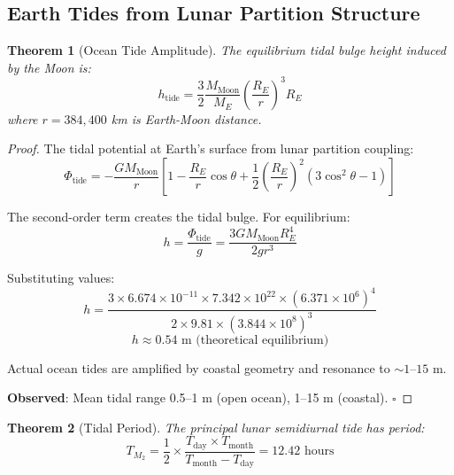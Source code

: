 \documentclass[twocolumn,10pt]{article}
\newtheorem{theorem}{Theorem}[section]
\theoremstyle{definition}
\theoremstyle{remark}
\begin{document}
\subsection{Earth Tides from Lunar Partition Structure}

\begin{theorem}[Ocean Tide Amplitude]
\label{thm:tides}
The equilibrium tidal bulge height induced by the Moon is:
\begin{equation}
h_{\text{tide}} = \frac{3}{2} \frac{M_{\text{Moon}}}{M_E} \left(\frac{R_E}{r}\right)^3 R_E
\end{equation}
where $r = 384,400$ km is Earth-Moon distance.
\end{theorem}

\begin{proof}
The tidal potential at Earth's surface from lunar partition coupling:
\begin{equation}
\Phi_{\text{tide}} = -\frac{GM_{\text{Moon}}}{r} \left[1 - \frac{R_E}{r}\cos\theta + \frac{1}{2}\left(\frac{R_E}{r}\right)^2(3\cos^2\theta - 1)\right]
\end{equation}

The second-order term creates the tidal bulge. For equilibrium:
\begin{equation}
h = \frac{\Phi_{\text{tide}}}{g} = \frac{3GM_{\text{Moon}}R_E^4}{2gr^3}
\end{equation}

Substituting values:
\begin{equation}
h = \frac{3 \times 6.674 \times 10^{-11} \times 7.342 \times 10^{22} \times (6.371 \times 10^6)^4}{2 \times 9.81 \times (3.844 \times 10^8)^3}
\end{equation}
\begin{equation}
h \approx 0.54 \text{ m (theoretical equilibrium)}
\end{equation}

Actual ocean tides are amplified by coastal geometry and resonance to $\sim 1$--$15$ m.

\textbf{Observed}: Mean tidal range 0.5--1 m (open ocean), 1--15 m (coastal). $\square$
\end{proof}

\begin{theorem}[Tidal Period]
\label{thm:tidal_period}
The principal lunar semidiurnal tide has period:
\begin{equation}
T_{M_2} = \frac{1}{2} \times \frac{T_{\text{day}} \times T_{\text{month}}}{T_{\text{month}} - T_{\text{day}}} = 12.42 \text{ hours}
\end{equation}
\end{theorem}
\end{document}
